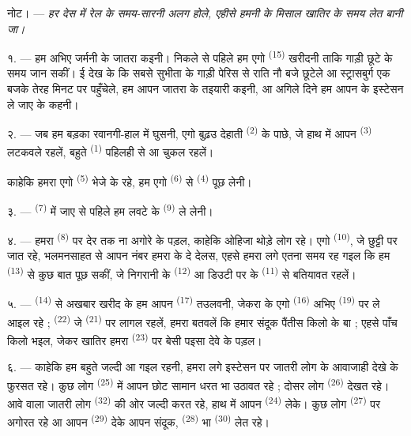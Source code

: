 \VUsaut{4.0mm}
\VUsaut{2.4mm}
\VUsaut{3.4mm}
\textsc{नोट।} --- \textit{हर देस में रेल के समय-सारनी अलग होले, एहीसे
हमनी के मिसाल खातिर}  \textit{के समय लेत बानी जा।}

१. --- हम अभिए जर्मनी के जातरा कइनी। निकले से पहिले हम एगो  \textsuperscript{(15)} खरीदनी ताकि गाड़ी छूटे के समय जान
सकीं। ई देख के कि सबसे सुभीता के गाड़ी पेरिस से राति नौ बजे छूटेले आ
स्ट्रासबुर्ग एक बजके तेरह मिनट पर पहुँचेले, हम आपन जातरा के तइयारी
कइनी, आ अगिले दिने हम आपन के इस्टेसन ले जाए के कहनी।

२. --- जब हम बड़का रवानगी-हाल में घुसनी, एगो बुढ़उ देहाती
 \textsuperscript{(2)} के पाछे, जे हाथ में आपन  \textsuperscript{(3)} लटकवले रहलें, बहुते 
\textsuperscript{(1)} पहिलही से आ चुकल रहलें।

काहेकि हमरा एगो  \textsuperscript{(5)} भेजे के रहे, हम एगो
 \textsuperscript{(6)} से 
\textsuperscript{(4)} पूछ लेनी।

३. ---  \textsuperscript{(7)} में जाए से पहिले हम
लवटे के  \textsuperscript{(9)} ले लेनी।

४. --- हमरा  \textsuperscript{(8)} पर देर तक ना अगोरे के
पड़ल, काहेकि ओहिजा थोड़े लोग रहे। एगो  \textsuperscript{(10)},
जे छुट्टी पर जात रहे, भलमनसाहत से आपन नंबर हमरा के दे देलस, एहसे हमरा
लगे एतना समय रह गइल कि हम  \textsuperscript{(13)}
से कुछ बात पूछ सकीं, जे निगरानी के  \textsuperscript{(12)} आ
डिउटी पर के  \textsuperscript{(11)} से बतियावत
रहलें।

\VUsaut{3.0mm}

५. ---  \textsuperscript{(14)} से अखबार खरीद के
हम आपन  \textsuperscript{(17)} तउलवनी, जेकरा के एगो
 \textsuperscript{(16)} अभिए 
\textsuperscript{(19)} पर ले आइल रहे ; 
\textsuperscript{(22)} जे  \textsuperscript{(21)} पर लागल
रहलें, हमरा
बतवलें कि हमार संदूक पैंतीस किलो के बा ; एहसे पाँच किलो  भइल, जेकर खातिर हमरा 
\textsuperscript{(23)} पर बेसी पइसा देवे के पड़ल।

६. --- काहेकि हम बहुते जल्दी आ गइल रहनी, हमरा लगे इस्टेसन पर जातरी
लोग के आवाजाही देखे के फुरसत रहे। कुछ लोग 
\textsuperscript{(25)} में आपन छोट सामान धरत भा उठावत रहे ; दोसर लोग
 \textsuperscript{(26)} देखत रहे। आवे वाला जातरी लोग
 \textsuperscript{(32)} की ओर जल्दी करत रहे, हाथ में
आपन  \textsuperscript{(24)} लेके। कुछ लोग  \textsuperscript{(27)} पर अगोरत रहे आ आपन 
\textsuperscript{(29)} देके आपन संदूक,  \textsuperscript{(28)}
भा  \textsuperscript{(30)} लेत रहे।

